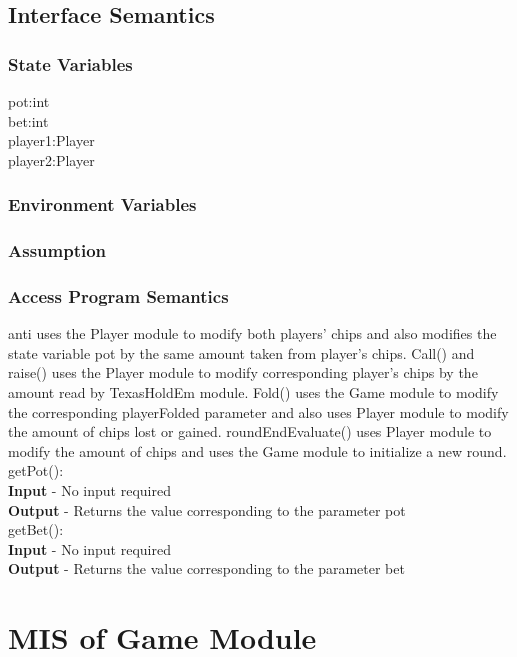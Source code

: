 \documentclass[11pt]{article}
\begin{document}
    \subsection{Interface Semantics}
    \subsubsection{State Variables}
    pot:int\\
    bet:int\\
    player1:Player\\
    player2:Player
    \subsubsection{Environment Variables}
    \subsubsection{Assumption}
    \subsubsection{Access Program Semantics}
    anti uses the Player module to modify both players' chips and also modifies the state variable pot by the same amount taken from player's chips. Call() and raise() uses the Player module to modify corresponding player's chips by the amount read by TexasHoldEm module. Fold() uses the Game module to modify the corresponding playerFolded parameter and also uses Player module to modify the amount of chips lost or gained. roundEndEvaluate() uses Player module to modify the amount of chips and uses the Game module to initialize a new round. \\
    getPot():\\
    \textbf{Input} - No input required\\
    \textbf{Output} - Returns the value corresponding to the parameter pot\\
    getBet():\\
    \textbf{Input} - No input required\\
    \textbf{Output} - Returns the value corresponding to the parameter bet
    \newline
     \section{MIS of Game Module}
     
\end{document}
